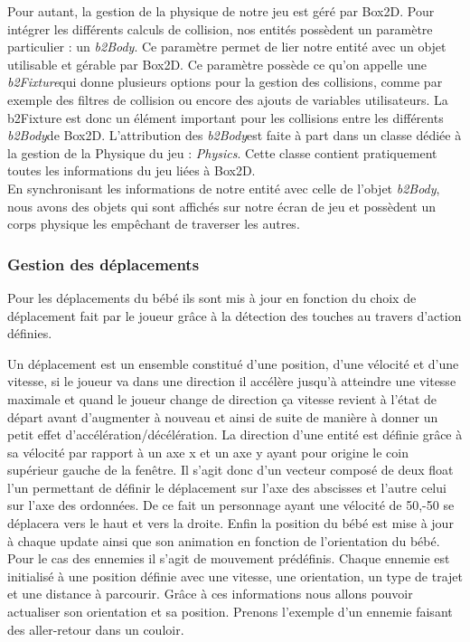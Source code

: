 \documentclass{article}
\begin{document}
Pour autant, la gestion de la physique de notre jeu est géré par Box2D. Pour intégrer les différents calculs de collision, nos entités possèdent un paramètre particulier : un \og \textit{b2Body}\fg. Ce paramètre permet de lier notre entité avec un objet utilisable et gérable par Box2D. Ce paramètre possède ce qu'on appelle une \og \textit{b2Fixture}\fg qui donne plusieurs options pour la gestion des collisions, comme par exemple des filtres de collision ou encore des ajouts de variables utilisateurs. La b2Fixture est donc un élément important pour les collisions entre les différents \og \textit{b2Body}\fg de Box2D. L'attribution des \og \textit{b2Body}\fg est faite à part dans un classe dédiée à la gestion de la Physique du jeu : \og \textit{Physics}\fg. Cette classe contient pratiquement toutes les informations du jeu liées à Box2D.\\

En synchronisant les informations de notre entité avec celle de l'objet \og \textit{b2Body}\fg, nous avons des objets qui sont affichés sur notre écran de jeu et possèdent un corps physique les empêchant de traverser les autres.

\subsubsection{Gestion des déplacements}
Pour les déplacements du bébé ils sont mis à jour en fonction du choix de déplacement fait par le joueur grâce à la détection des touches au travers d'action définies. 

Un déplacement est un ensemble constitué d'une position, d'une vélocité et d'une vitesse, si le joueur va dans une direction il accélère jusqu'à atteindre une vitesse maximale et quand le joueur change de direction ça vitesse revient à l'état de départ avant d'augmenter à nouveau et ainsi de suite de manière à donner un petit effet d'accélération/décélération. La direction d'une entité est définie grâce à sa vélocité par rapport à un axe x et un axe y ayant pour origine le coin supérieur gauche de la fenêtre. Il s'agit donc d'un vecteur composé de deux float l'un permettant de définir le déplacement sur l'axe des abscisses et l'autre celui sur l'axe des ordonnées. De ce fait un personnage ayant une vélocité de 50,-50 se déplacera vers le haut et vers la droite.
Enfin la position du bébé est mise à jour à chaque update ainsi que son animation en fonction de l'orientation du bébé.\bigbreak
Pour le cas des ennemies il s'agit de mouvement prédéfinis. Chaque ennemie est initialisé à une position définie avec une vitesse, une orientation, un type de trajet et une distance à parcourir. Grâce à ces informations nous allons pouvoir actualiser son orientation et sa position. Prenons l'exemple d'un ennemie faisant des aller-retour dans un couloir. 
\end{document}
